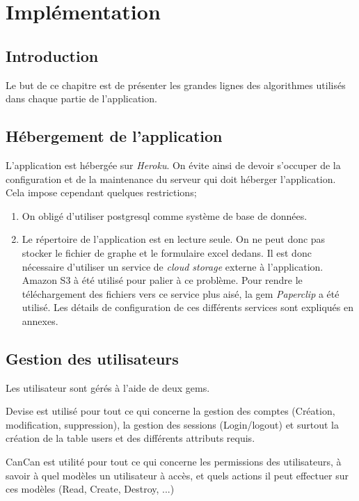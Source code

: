 \clearpage
\section{Implémentation}
\subsection{Introduction}
Le but de ce chapitre est de présenter les grandes lignes des algorithmes utilisés dans chaque partie de l'application. 
\subsection{Hébergement de l'application}
L'application est hébergée sur \textit{Heroku}. On évite ainsi de devoir s'occuper de la configuration et de la maintenance du serveur qui doit héberger l'application. Cela impose cependant quelques restrictions;
\begin{enumerate}
  \item On obligé d'utiliser postgresql comme système de base de données.
  \item Le répertoire de l'application est en lecture seule. On ne peut donc pas stocker le fichier de graphe et le formulaire excel dedans. Il est donc nécessaire d'utiliser un service de \textit{cloud storage} externe à l'application. Amazon S3 à été utilisé pour palier à ce problème. Pour rendre le téléchargement des fichiers vers ce service plus aisé, la gem \textit{Paperclip} a été utilisé. Les détails de configuration de ces différents services sont expliqués en annexes. 
\end{enumerate}
\subsection{Gestion des utilisateurs}
\label{user_mgmt}
Les utilisateur sont gérés à l'aide de deux gems. 

Devise est utilisé pour tout ce qui concerne la gestion des comptes (Création, modification, suppression), la gestion des sessions (Login/logout) et surtout la création de la table users et des différents attributs requis.

CanCan est utilité pour tout ce qui concerne les permissions des utilisateurs, à savoir à quel modèles un utilisateur à accès, et quels actions il peut effectuer sur ces modèles (Read, Create, Destroy, ...) 

